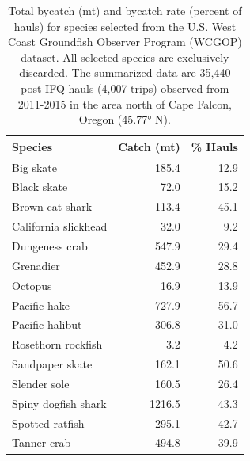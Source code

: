 \documentclass[]{article}
\begin{document}
\begin{table}[t]

\caption{\label{tab:species-list}\label{tab:species-list}Total bycatch (mt) and bycatch rate (percent of hauls) for species selected from the U.S. West Coast Groundfish Observer Program (WCGOP) dataset. All selected species are exclusively discarded. The summarized data are 35,440 post-IFQ hauls (4,007 trips) observed from 2011-2015 in the area north of Cape Falcon, Oregon (45.77° N).}
\centering
\begin{tabular}{lrr}
\toprule
Species & Catch (mt) & \% Hauls\\
\midrule
Big skate & 185.4 & 12.9\\
Black skate & 72.0 & 15.2\\
Brown cat shark & 113.4 & 45.1\\
California slickhead & 32.0 & 9.2\\
Dungeness crab & 547.9 & 29.4\\
\addlinespace
Grenadier & 452.9 & 28.8\\
Octopus & 16.9 & 13.9\\
Pacific hake & 727.9 & 56.7\\
Pacific halibut & 306.8 & 31.0\\
Rosethorn rockfish & 3.2 & 4.2\\
\addlinespace
Sandpaper skate & 162.1 & 50.6\\
Slender sole & 160.5 & 26.4\\
Spiny dogfish shark & 1216.5 & 43.3\\
Spotted ratfish & 295.1 & 42.7\\
Tanner crab & 494.8 & 39.9\\
\bottomrule
\end{tabular}
\end{table}

\pagebreak
\end{document}
